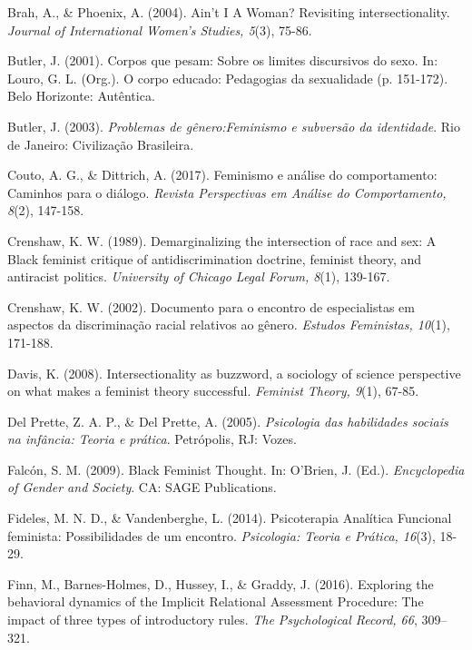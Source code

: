 \hangindent=25pt
\noindent Brah, A., \& Phoenix, A. (2004). Ain’t I A Woman? Revisiting intersectionality. \textit{Journal of International Women’s Studies, 5}(3), 75-86.

\hangindent=25pt
\noindent Butler, J. (2001). Corpos que pesam: Sobre os limites discursivos do sexo. In: Louro, G. L. (Org.). O corpo educado: Pedagogias da sexualidade (p. 151-172). Belo Horizonte: Autêntica.

\hangindent=25pt
\noindent Butler, J. (2003). \textit{Problemas de gênero:Feminismo e subversão da identidade}. Rio de Janeiro: Civilização Brasileira. 

\hangindent=25pt
\noindent Couto, A. G., \& Dittrich, A. (2017). Feminismo e análise do comportamento: Caminhos para o diálogo. \textit{Revista Perspectivas em Análise do Comportamento, 8}(2), 147-158. 

\hangindent=25pt
\noindent Crenshaw, K. W. (1989). Demarginalizing the intersection of race and sex: A Black feminist critique of antidiscrimination doctrine, feminist theory, and antiracist politics. \textit{University of Chicago Legal Forum, 8}(1), 139-167. 

\hangindent=25pt
\noindent Crenshaw, K. W. (2002). Documento para o encontro de especialistas em aspectos da discriminação racial relativos ao gênero. \textit{Estudos Feministas, 10}(1), 171-188.

\hangindent=25pt
\noindent Davis, K. (2008). Intersectionality as buzzword, a sociology of science perspective on what makes a feminist theory successful. \textit{Feminist Theory, 9}(1), 67-85. 

\hangindent=25pt
\noindent Del Prette, Z. A. P., \& Del Prette, A. (2005). \textit{Psicologia das habilidades sociais na infância: Teoria e prática}. Petrópolis, RJ: Vozes.

\hangindent=25pt
\noindent Falcón, S. M. (2009). Black Feminist Thought. In: O’Brien, J. (Ed.). \textit{Encyclopedia of Gender and Society}. CA: SAGE Publications. 

\hangindent=25pt
\noindent Fideles, M. N. D., \& Vandenberghe, L. (2014). Psicoterapia Analítica Funcional feminista: Possibilidades de um encontro. \textit{Psicologia: Teoria e Prática, 16}(3), 18-29.

\hangindent=25pt
\noindent Finn, M., Barnes-Holmes, D., Hussey, I., \& Graddy, J. (2016). Exploring the behavioral dynamics of the Implicit Relational Assessment Procedure: The impact of three types of introductory rules. \textit{The Psychological Record, 66}, 309–321.

